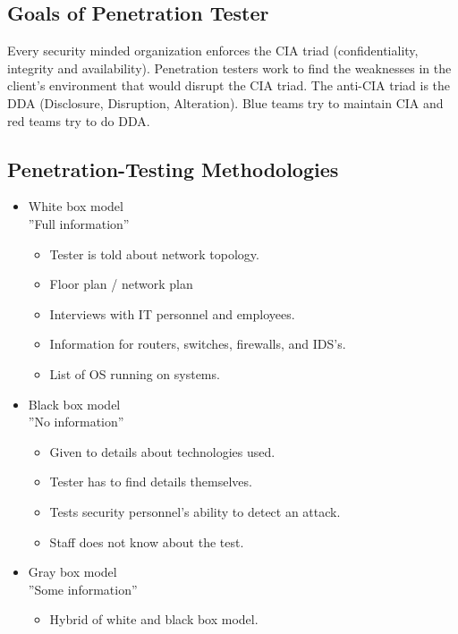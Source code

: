 \subsection{Goals of Penetration Tester}
Every security minded organization enforces the CIA triad (confidentiality, integrity and availability).
Penetration testers work to find the weaknesses in the client's environment that would disrupt the CIA triad.
The anti-CIA triad is the DDA (Disclosure, Disruption, Alteration).
Blue teams try to maintain CIA and red teams try to do DDA.

\subsection{Penetration-Testing Methodologies}
\begin{itemize}
    \item White box model\\ ''Full information''
    \begin{itemize}
        \item Tester is told about network topology.
        \item Floor plan / network plan
        \item Interviews with IT personnel and employees.
        \item Information for routers, switches, firewalls, and IDS's.
        \item List of OS running on systems.
    \end{itemize}
    \item Black box model\\ ''No information''
    \begin{itemize}
        \item Given to details about technologies used.
        \item Tester has to find details themselves.
        \item Tests security personnel's ability to detect an attack.
        \item Staff does not know about the test.
    \end{itemize}
    \item Gray box model\\ ''Some information''
    \begin{itemize}
        \item Hybrid of white and black box model.
    \end{itemize}
\end{itemize}

